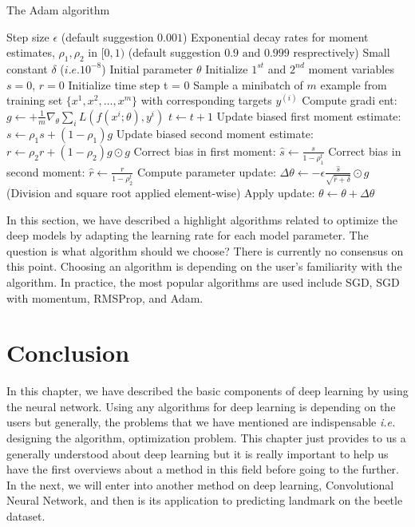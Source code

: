 \begin{algorithm}
	\caption{The Adam algorithm}
	\label{Adam_algorithm}
	\begin{algorithmic}
		\REQUIRE Step size $\epsilon$ (default suggestion $0.001$)
		\REQUIRE Exponential decay rates for moment estimates, $\rho_1, \rho_2$ in $[0, 1)$ (default suggestion $0.9 \text{ and } 0.999$ resprectively)
		\REQUIRE Small constant $\delta$ ($i.e. 10^{-8}$)
		\REQUIRE Initial parameter $\theta$
		\STATE Initialize $1^{st}$ and $2^{nd}$ moment variables $s = 0$, $r = 0$
		\STATE Initialize time step t = 0
			\STATE Sample a minibatch of $m$ example from training set $\{ x^1,x^2,\ldots, x^m \}$ with corresponding targets $y^{(i)}$
			\STATE Compute gradi ent: $g \leftarrow + \frac{1}{m} \nabla_{\theta} \sum_i L(f(x^i;\theta), y^i) $
			\STATE $t \leftarrow t + 1$
			\STATE Update biased first moment estimate: $s \leftarrow \rho_1 s + (1 - \rho_1)g$
			\STATE Update biased second moment estimate: $r \leftarrow \rho_2 r + (1 - \rho_2)g \odot g $
			\STATE Correct bias in first moment: $\hat{s} \leftarrow \frac{s}{1-\rho_1^t}$
			\STATE Correct bias in second moment: $\hat{r} \leftarrow \frac{r}{1 - \rho_2^t}$
			\STATE Compute parameter update: $\Delta \theta \leftarrow - \epsilon \frac{\hat{s}}{\sqrt{\hat{r} + \delta}} \odot g$ (Division and square root applied element-wise)
			\STATE Apply update: $\theta \leftarrow \theta + \Delta \theta$
		\ENDWHILE
	\end{algorithmic}
\end{algorithm}

In this section, we have described a highlight algorithms related to optimize the deep models by adapting the learning rate for each model parameter. The question is what algorithm should we choose? There is currently no consensus on this point. Choosing an algorithm is depending on the user's familiarity with the algorithm. In practice, the most popular algorithms are used include  SGD, SGD with momentum, RMSProp, and Adam.

\section{Conclusion}
In this chapter, we have described the basic components of deep learning by using the neural network. Using any algorithms for deep learning is depending on the users but generally, the problems that we have mentioned are indispensable \textit{i.e.} designing the algorithm, optimization problem. This chapter just provides to us a generally understood about deep learning but it is really important to help us have the first overviews about a method in this field before going to the further. In the next, we will enter into another method on deep learning, Convolutional Neural Network, and then is its application to predicting landmark on the beetle dataset.